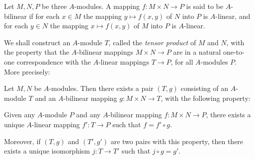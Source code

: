 
Let $M, N, P$ be three $A$-modules. A mapping $f \colon M \times N \to P$ is said to be $A$-bilinear if for each $x \in M$ the mapping $y \mapsto f(x, y)$ of $N$ into $P$ is $A$-linear, and for each $y \in N$ the mapping $x \mapsto f(x, y)$ of $M$ into $P$ is $A$-linear.

We shall construct an $A$-module $T$, called the \textit{tensor product} of $M$ and $N$, with the property that the $A$-bilinear mappings $M \times N \to P$ are in a natural one-to-one correspondence with the $A$-linear mappings $T \to P$, for all $A$-modules $P$. More precisely:

\begin{proposition}\label{prop:tensor-universal}
Let $M, N$ be $A$-modules. Then there exists a pair $(T, g)$ consisting of an $A$-module $T$ and an $A$-bilinear mapping $g \colon M \times N \to T$, with the following property:

Given any $A$-module $P$ and any $A$-bilinear mapping $f \colon M \times N \to P$, there exists a unique $A$-linear mapping $f' \colon T \to P$ such that $f = f' \circ g$.

Moreover, if $(T, g)$ and $(T', g')$ are two pairs with this property, then there exists a unique isomorphism $j \colon T \to T'$ such that $j \circ g = g'$.
\end{proposition}

